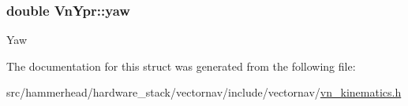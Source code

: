 \subsubsection[{\texorpdfstring{yaw}{yaw}}]{\setlength{\rightskip}{0pt plus 5cm}double Vn\+Ypr\+::yaw}\hypertarget{structVnYpr_a1b600c94305ce2ce8a997a36f0e704af}{}\label{structVnYpr_a1b600c94305ce2ce8a997a36f0e704af}
Yaw 

The documentation for this struct was generated from the following file\+:\begin{DoxyCompactItemize}
\item 
src/hammerhead/hardware\+\_\+stack/vectornav/include/vectornav/\hyperlink{vn__kinematics_8h}{vn\+\_\+kinematics.\+h}\end{DoxyCompactItemize}

